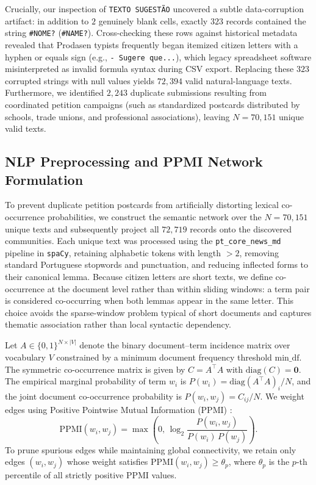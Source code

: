 \documentclass[pdflatex,sn-basic]{sn-jnl}
\begin{document}
Crucially, our inspection of \texttt{TEXTO SUGEST\~{A}O} uncovered a subtle data-corruption artifact: in addition to $2$ genuinely blank cells, exactly $323$ records contained the string \texttt{\#NOME?} (\texttt{\#NAME?}). Cross-checking these rows against historical metadata revealed that Prodasen typists frequently began itemized citizen letters with a hyphen or equals sign (e.g., \texttt{- Sugere que...}), which legacy spreadsheet software misinterpreted as invalid formula syntax during CSV export. Replacing these $323$ corrupted strings with null values yields $72,394$ valid natural-language texts. Furthermore, we identified $2,243$ duplicate submissions resulting from coordinated petition campaigns (such as standardized postcards distributed by schools, trade unions, and professional associations), leaving $N = 70,151$ unique valid texts.

\subsection{NLP Preprocessing and PPMI Network Formulation}
To prevent duplicate petition postcards from artificially distorting lexical co-occurrence probabilities, we construct the semantic network over the $N = 70,151$ unique texts and subsequently project all $72,719$ records onto the discovered communities. Each unique text was processed using the \texttt{pt\_core\_news\_md} pipeline in \texttt{spaCy}, retaining alphabetic tokens with length $>2$, removing standard Portuguese stopwords and punctuation, and reducing inflected forms to their canonical lemma. %
Because citizen letters are short texts, we define co-occurrence at the document level rather than within sliding windows: a term pair is considered co-occurring when both lemmas appear in the same letter. This choice avoids the sparse-window problem typical of short documents and captures thematic association rather than local syntactic dependency.

Let $A \in \{0,1\}^{N \times |V|}$ denote the binary document--term incidence matrix over vocabulary $V$ constrained by a minimum document frequency threshold $\text{min\_df}$. The symmetric co-occurrence matrix is given by $C = A^{\top} A$ with $\text{diag}(C) = \mathbf{0}$. The empirical marginal probability of term $w_i$ is $P(w_i) = \text{diag}(A^{\top}A)_i / N$, and the joint document co-occurrence probability is $P(w_i, w_j) = C_{ij} / N$. We weight edges using Positive Pointwise Mutual Information (PPMI) \citep{church1990word,bullinaria2007extracting}:
\begin{equation}
    \text{PPMI}(w_i, w_j) = \max\left(0, \, \log_2 \frac{P(w_i, w_j)}{P(w_i)\,P(w_j)}\right).
\end{equation}
To prune spurious edges while maintaining global connectivity, we retain only edges $(w_i, w_j)$ whose weight satisfies $\text{PPMI}(w_i, w_j) \ge \theta_p$, where $\theta_p$ is the $p$-th percentile of all strictly positive PPMI values.
\end{document}
